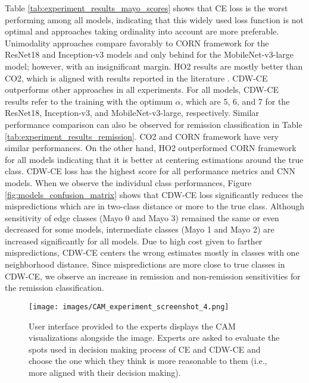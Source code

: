 \documentclass[runningheads]{llncs}
\begin{document}
Table \ref{tab:experiment_results_mayo_scores} shows that CE loss is the worst performing among all models, indicating that this widely used loss function is not optimal and approaches taking ordinality into account are more preferable. Unimodality approaches compare favorably to CORN framework for the ResNet18 and Inception-v3 models and only behind for the MobileNet-v3-large model; however, with an insignificant margin. HO2 results are mostly better than CO2, which is aligned with results reported in the literature \cite{albuquerque2021ordinal}. CDW-CE outperforms other approaches in all experiments. For all models, CDW-CE results refer to the training with the optimum $\alpha$, which are 5, 6, and 7 for the ResNet18, Inception-v3, and MobileNet-v3-large, respectively. Similar performance comparison can also be observed for remission classification in Table \ref{tab:experiment_results_remission}. CO2 and CORN framework have very similar performances. On the other hand, HO2 outperformed CORN framework for all models indicating that it is better at centering estimations around the true class. CDW-CE loss has the highest score for all performance metrics and CNN models. When we observe the individual class performances, Figure \ref{fig:models_confusion_matrix} shows that CDW-CE loss significantly reduces the mispredictions which are in two-class distance or more to the true class. Although sensitivity of edge classes (Mayo 0 and Mayo 3) remained the same or even decreased for some models, intermediate classes (Mayo 1 and Mayo 2) are increased significantly for all models. Due to high cost given to farther mispredictions, CDW-CE centers the wrong estimates mostly in classes with one neighborhood distance. Since mispredictions are more close to true classes in CDW-CE, we observe an increase in remission and non-remission sensitivities for the remission classification.

\begin{figure}[t!]
  \centering
  \texttt{[image: images/CAM\_experiment\_screenshot\_4.png]}
  \caption{User interface provided to the experts displays the CAM visualizations alongside the image. Experts are asked to evaluate the spots used in decision making process of CE and CDW-CE and choose the one which they think is more reasonable to them (i.e., more aligned with their decision making).} 
  \label{fig:cam_experiment_screenshot}
\end{figure}
\end{document}
